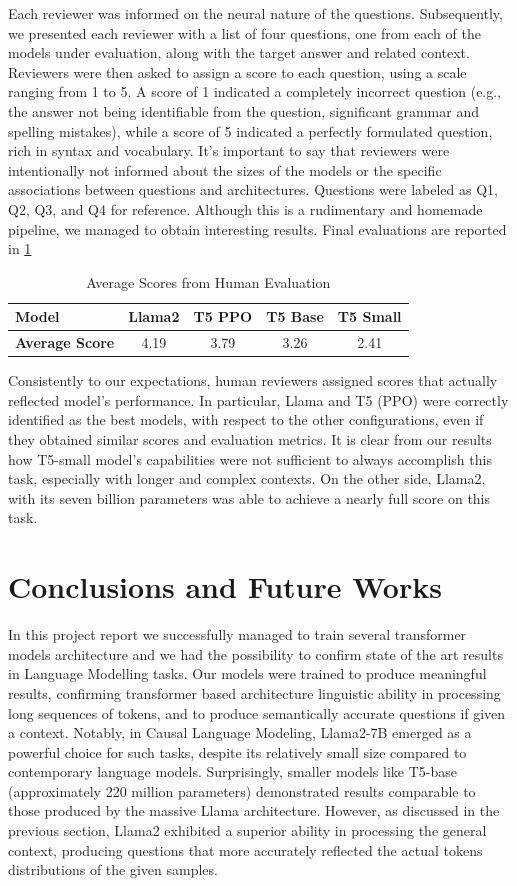 \documentclass{article}
\begin{document}
Each reviewer was informed on the neural nature of the questions. Subsequently, we presented each reviewer with a list of four questions, one from each of the models under evaluation, along with the target answer and related context. Reviewers were then asked to assign a score to each question, using a scale ranging from 1 to 5. A score of 1 indicated a completely incorrect question (e.g., the answer not being identifiable from the question, significant grammar and spelling mistakes), while a score of 5 indicated a perfectly formulated question, rich in syntax and vocabulary.
It's important to say that reviewers were intentionally not informed about the sizes of the models or the specific associations between questions and architectures. Questions were labeled as Q1, Q2, Q3, and Q4 for reference.
Although this is a rudimentary and homemade pipeline, we managed to obtain interesting results. Final evaluations are reported in \ref{table:human_evaluation} 
\begin{table}[h]
\centering
\begin{tabular}{lcccc}
\toprule
\textbf{Model} & Llama2 & T5 PPO & T5 Base & T5 Small \\
\midrule
\textbf{Average Score} & 4.19 & 3.79 & 3.26 & 2.41 \\
\bottomrule
\midrule
\end{tabular}
\caption{Average Scores from Human Evaluation}
\label{table:human_evaluation}
\end{table}
Consistently to our expectations, human reviewers assigned scores that actually reflected model's performance. In particular, Llama and T5 (PPO) were correctly identified as the best models, with respect to the other configurations, even if they obtained similar scores and evaluation metrics. It is clear from our results how T5-small model's capabilities were not sufficient to always accomplish this task, especially with longer and complex contexts. On the other side, Llama2, with its seven billion parameters was able to achieve a nearly full score on this task.



\label{experiments}
\section{Conclusions and Future Works}
In this project report we successfully managed to train several transformer models architecture and we had the possibility to confirm state of the art results in Language Modelling tasks. Our models were trained to produce meaningful results, confirming transformer based architecture linguistic ability in processing long sequences of tokens, and to produce semantically accurate questions if given a context. Notably, in Causal Language Modeling, Llama2-7B emerged as a powerful choice for such tasks, despite its relatively small size compared to contemporary language models. Surprisingly, smaller models like T5-base (approximately 220 million parameters) demonstrated results comparable to those produced by the massive Llama architecture. However, as discussed in the previous section, Llama2 exhibited a superior ability in processing the general context, producing questions that more accurately reflected the actual tokens distributions of the given samples.
\end{document}
